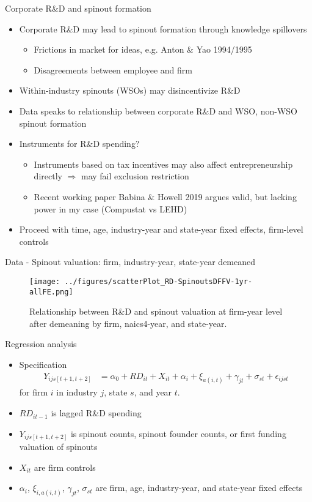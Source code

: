\documentclass[english,usenames,dvipsnames]{beamer}
\begin{document}
\begin{frame}{Corporate R\&D and spinout formation}
\begin{itemize}
	\item Corporate R\&D may lead to spinout formation through knowledge spillovers
	\begin{itemize}
		\item Frictions in market for ideas, e.g. Anton \& Yao 1994/1995
		\item Disagreements between employee and firm
	\end{itemize}
	\item Within-industry spinouts (WSOs) may disincentivize R\&D
	\item Data speaks to relationship between corporate R\&D and WSO, non-WSO spinout formation
	\item Instruments for R\&D spending?
	\begin{itemize}
		\item Instruments based on tax incentives may also affect entrepreneurship directly $\Rightarrow$ may fail exclusion restriction
		\item Recent working paper Babina \& Howell 2019 argues valid, but lacking power in my case (Compustat vs LEHD)
	\end{itemize}
	\item Proceed with time, age, industry-year and state-year fixed effects, firm-level controls
\end{itemize}
\end{frame}


\begin{frame}{Data - Spinout valuation: firm, industry-year, state-year demeaned}
\begin{figure}
	\texttt{[image: ../figures/scatterPlot\_RD-SpinoutsDFFV-1yr-allFE.png]}
	\caption{Relationship between R\&D and spinout valuation at firm-year level after demeaning by firm, naics4-year, and state-year.}
\end{figure}
\end{frame}



\begin{frame}{Regression analysis}
\begin{itemize}
	\item Specification
	\begin{align*}
	Y_{ijs[t+1,t+2]} &= \alpha_0 + RD_{it} + X_{it} + \alpha_i + \xi_{a(i,t)} +  \gamma_{jt} + \sigma_{st} + \epsilon_{ijst}
	\end{align*}
	for firm $i$ in industry $j$, state $s$, and year $t$.
	\item $RD_{it-1}$ is lagged R\&D spending
	\item $Y_{ijs[t+1,t+2]}$ is spinout counts, spinout founder counts, or first funding valuation of spinouts
	\item $X_{it}$ are firm controls
	\item $\alpha_i$, $\xi_{i,a(i,t)}$, $\gamma_{jt}$, $\sigma_{st}$ are firm, age, industry-year, and state-year fixed effects
\end{itemize}
\end{frame}
\end{document}
